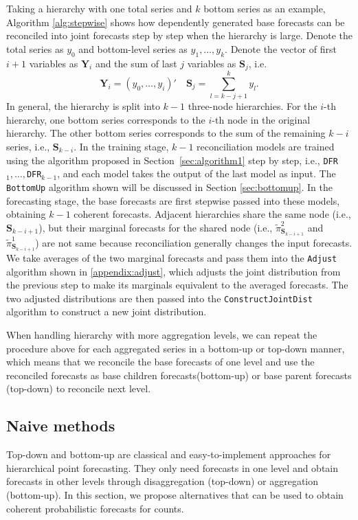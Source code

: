 \documentclass[a4paper,review,12pt,authoryear]{elsarticle}
\let\code=\texttt
\newcommand{\bY}{\mathbf{Y}}
\begin{document}
  Taking a hierarchy with one total series and $k$ bottom series as an example, Algorithm \ref{alg:stepwise} shows how dependently generated base forecasts can be reconciled into joint forecasts step by step when the hierarchy is large. 
  Denote the total series as $y_0$ and bottom-level series as $y_1, \dots, y_k$. 
  Denote the vector of first $i+1$ variables as $\mathbf{Y}_i$ and the sum of last $j$ variables as $\mathbf{S}_j$, i.e.
  \[
    \bY_i = (y_0, \dots, y_i)' \quad \mathbf{S}_j = \sum_{l=k-j+1}^{k} y_l.
  \] 
  In general, the hierarchy is split into $k-1$ three-node hierarchies.  
  For the $i$-th hierarchy, one bottom series corresponds to the $i$-th node in the original hierarchy. The other bottom series corresponds to the sum of the remaining $k-i$ series, i.e., $\mathbf{S}_{k-i}$.
  In the training stage, $k-1$ reconciliation models are trained using the algorithm proposed in Section~\ref{sec:algorithm1} step by step, i.e., \code{DFR}$_1,\dots,$\code{DFR}$_{k-1}$, and each model takes the output of the last model as input.
  The \code{BottomUp} algorithm shown will be discussed in Section \ref{sec:bottomup}.
  In the forecasting stage, the base forecasts are first stepwise passed into these models, obtaining $k-1$ coherent forecasts.
  Adjacent hierarchies share the same node (i.e., $\mathbf{S}_{k-i+1}$), but their marginal forecasts for the shared node (i.e., $\tilde\pi^{2}_{\mathbf{S}_{k-i+1}}$ and $\tilde\pi^{1}_{\mathbf{S}_{k-i+1}}$) are not same because reconciliation generally changes the input forecasts.
  We take averages of the two marginal forecasts and pass them into the \code{Adjust} algorithm shown in \ref{appendix:adjust}, which adjusts the joint distribution from the previous step to make its marginals equivalent to the averaged forecasts.
  The two adjusted distributions are then passed into the \code{ConstructJointDist} algorithm to construct a new joint distribution.

    When handling hierarchy with more aggregation levels, we can repeat the procedure above for each aggregated series in a bottom-up or top-down manner, which means that we reconcile the base forecasts of one level and use the reconciled forecasts as base children forecasts(bottom-up) or base parent forecasts (top-down) to reconcile next level.

    \subsection{Naive methods}

    Top-down and bottom-up are classical and easy-to-implement approaches for hierarchical point forecasting. 
    They only need forecasts in one level and obtain forecasts in other levels through disaggregation (top-down) or aggregation (bottom-up).
    In this section, we propose alternatives that can be used to obtain coherent probabilistic forecasts for counts.
\end{document}
